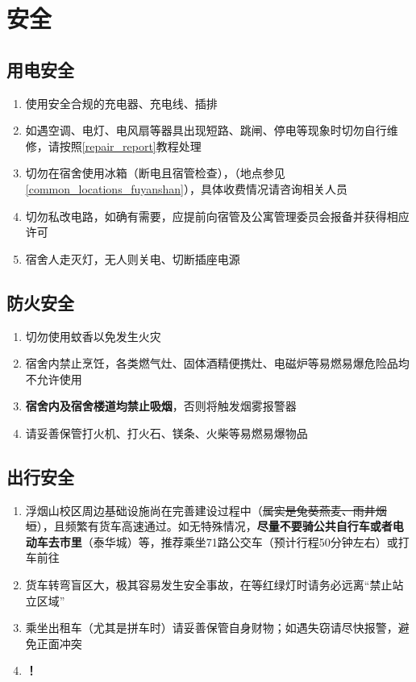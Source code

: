 \chapter[安全]{安全}

\section[用电安全]{用电安全}
\begin{enumerate}
    \item 使用安全合规的充电器、充电线、插排
    \item 如遇空调、电灯、电风扇等器具出现短路、跳闸、停电等现象时切勿自行维修，请按照\uline{\ref{repair_report}}教程处理
    \item 切勿在宿舍使用冰箱（断电且宿管检查），\textbf{}（地点参见\uline{\ref{common_locations_fuyanshan}}），具体收费情况请咨询相关人员
    \item 切勿私改电路，如确有需要，应提前向宿管及公寓管理委员会\footnotemark 报备并获得相应许可
    \item 宿舍人走灭灯，无人则关电、切断插座电源
\end{enumerate}

\section[防火安全]{防火安全}
\begin{enumerate}
    \item 切勿使用蚊香以免发生火灾
    \item 宿舍内禁止烹饪，各类燃气灶、固体酒精便携灶、电磁炉等易燃易爆危险品均不允许使用
    \item \textbf{宿舍内及宿舍楼道均禁止吸烟}，否则将触发烟雾报警器
    \item 请妥善保管打火机、打火石、镁条、火柴等易燃易爆物品
\end{enumerate}

\section[出行安全]{出行安全}
\begin{enumerate}
    \item 浮烟山校区周边基础设施尚在完善建设过程中（\sout{属实是兔葵燕麦、雨井烟垣}），且频繁有货车高速通过。如无特殊情况，\textbf{尽量不要骑公共自行车或者电动车去市里}（泰华城）等，推荐乘坐71路公交车（预计行程50分钟左右）或打车前往
    \item 货车转弯盲区大，极其容易发生安全事故，在等红绿灯时请务必远离“禁止站立区域”
    \item 乘坐出租车（尤其是拼车时）请妥善保管自身财物；如遇失窃请尽快报警，避免正面冲突
    \item \textbf{！}
\end{enumerate}

